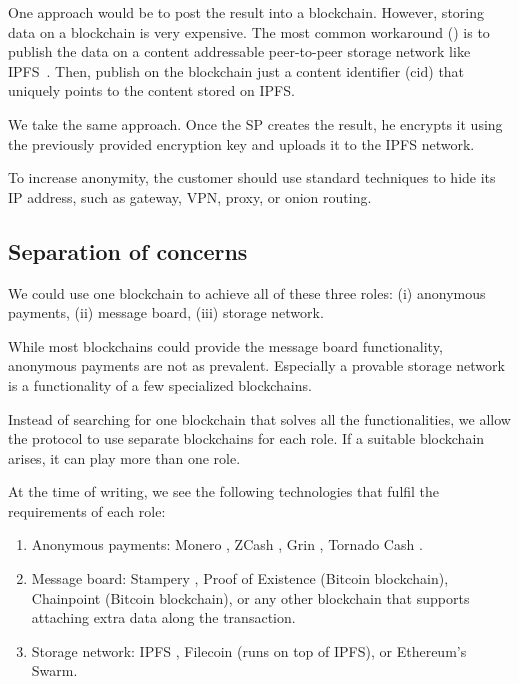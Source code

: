 \documentclass{ieeeaccess}
\begin{document}
One approach would be to post the result into a blockchain. However, storing data on a blockchain is very expensive. The most common workaround (\cite{shahid2020blockchain, wang2019auditable, chen2017improved, Usageide95}) is to publish the data on a content addressable peer-to-peer storage network like IPFS~\cite{benet2014ipfs}. Then, publish on the blockchain just a content identifier ($\mathrm{cid}$) that uniquely points to the content stored on IPFS.

We take the same approach. Once the SP creates the result, he encrypts it using the previously provided encryption key and uploads it to the IPFS network.

To increase anonymity, the customer should use standard techniques to hide its IP address, such as gateway, VPN, proxy, or onion routing.

\subsection{Separation of concerns}
We could use one blockchain to achieve all of these three roles: (i) anonymous payments, (ii) message board, (iii) storage network.

While most blockchains could provide the message board functionality, anonymous payments are not as prevalent. Especially a provable storage network is a functionality of a few specialized blockchains.

Instead of searching for one blockchain that solves all the functionalities, we allow the protocol to use separate blockchains for each role. If a suitable blockchain arises, it can play more than one role.

At the time of writing, we see the following technologies that fulfil the requirements of each role:

\begin{enumerate}
\def\labelenumi{\arabic{enumi}.}

\item Anonymous payments: Monero \cite{van2013cryptonote}, ZCash
  \cite{sasson2014zerocash}, Grin \cite{fuchsbauer2019aggregate},
  Tornado Cash \cite{pertsev2019tornado}.
\item Message board: Stampery \cite{de2016stampery}, Proof of Existence
  \cite{proofofexistence} (Bitcoin blockchain), Chainpoint
  \cite{Chainpoi39} (Bitcoin blockchain), or any other blockchain that
  supports attaching extra data along the transaction.
\item Storage network: IPFS \cite{benet2014ipfs}, Filecoin
  \cite{benetfilecoin} (runs on top of IPFS), or Ethereum's
  Swarm\cite{swarmwhi49}.
\end{enumerate}
\end{document}
